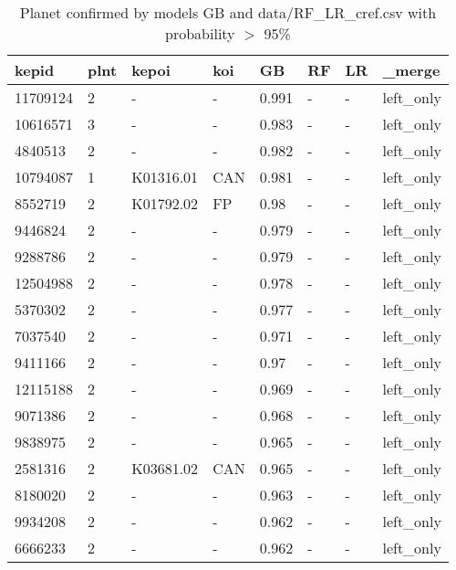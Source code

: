 \begin{table}[!htbp]
 \centering
 \caption{Planet confirmed by models GB and data/RF\_LR\_cref.csv with probability $>$ 95\%}
 \label{dataGBRFLRcreftab} 
  \begin{tabular}
{| 
 p{}| 
 p{}| 
 p{}| 
 p{}| 
 p{}| 
 p{}| 
 p{}| 
 p{}| 
}\hline 
\textbf{kepid} &\textbf{plnt} &\textbf{kepoi} &\textbf{koi} &\textbf{GB} &\textbf{RF} &\textbf{LR} &\textbf{\_merge} \\ \hline 
11709124 &2 &- &- &0.991 &- &- &left\_only \\ \hline 
10616571 &3 &- &- &0.983 &- &- &left\_only \\ \hline 
4840513 &2 &- &- &0.982 &- &- &left\_only \\ \hline 
10794087 &1 &K01316.01 &CAN &0.981 &- &- &left\_only \\ \hline 
8552719 &2 &K01792.02 &FP &0.98 &- &- &left\_only \\ \hline 
9446824 &2 &- &- &0.979 &- &- &left\_only \\ \hline 
9288786 &2 &- &- &0.979 &- &- &left\_only \\ \hline 
12504988 &2 &- &- &0.978 &- &- &left\_only \\ \hline 
5370302 &2 &- &- &0.977 &- &- &left\_only \\ \hline 
7037540 &2 &- &- &0.971 &- &- &left\_only \\ \hline 
9411166 &2 &- &- &0.97 &- &- &left\_only \\ \hline 
12115188 &2 &- &- &0.969 &- &- &left\_only \\ \hline 
9071386 &2 &- &- &0.968 &- &- &left\_only \\ \hline 
9838975 &2 &- &- &0.965 &- &- &left\_only \\ \hline 
2581316 &2 &K03681.02 &CAN &0.965 &- &- &left\_only \\ \hline 
8180020 &2 &- &- &0.963 &- &- &left\_only \\ \hline 
9934208 &2 &- &- &0.962 &- &- &left\_only \\ \hline 
6666233 &2 &- &- &0.962 &- &- &left\_only \\ \hline 

\end{tabular}
\end{table}
